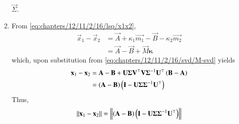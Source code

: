 \begin{enumerate}[label=\thesubsection.\arabic*.,ref=\thesubsection.\theenumi]
    $\vec{\Sigma}$. 
		\item 
	    From \eqref{eq:chapters/12/11/2/16/lsq/x1x2}, 
\begin{align}
	\vec{x}_1-\vec{x}_2 &= 
	\vec{A}+ \kappa_1\vec{m_1}
	 -\vec{B}  - \kappa_2\vec{m_2} 
	 \\
	 &=
	\vec{A} 
	 -\vec{B}  + \vec{M} 
	\bm{\kappa}
\end{align}
which, upon substitution from 
        \eqref{eq:chapters/12/11/2/16/svd/M-svd}
	yields
\begin{align}
	\mathbf{x}_1-\mathbf{x}_2 &= 
	\mathbf{A} 
	 -\mathbf{B}  + 
\mathbf{U}\mathbf{\Sigma}\mathbf{V}^\top
\mathbf{V}\mathbf{\Sigma}^{-1}\mathbf{U}^\top\left(\mathbf{B}-\mathbf{A}\right)
\\
	&=
	\left(	\mathbf{A} 
	 -\mathbf{B}\right)  \left(\mathbf{I}- 
\mathbf{U}\mathbf{\Sigma}
	\mathbf{\Sigma}^{-1}\mathbf{U}^\top\right)
\end{align}
			Thus, 
    \begin{align}
	    \left\lVert\mathbf{x}_1-\mathbf{x}_2\right\rVert = 
	\left\lVert\left(	\mathbf{A} 
	 -\mathbf{B}\right)  \left(\mathbf{I}- 
\mathbf{U}\mathbf{\Sigma}
	    \mathbf{\Sigma}^{-1}\mathbf{U}^\top\right)\right\rVert
        \label{eq:chapters/12/11/2/16/svd/min-sol}
    \end{align}
\end{enumerate}
